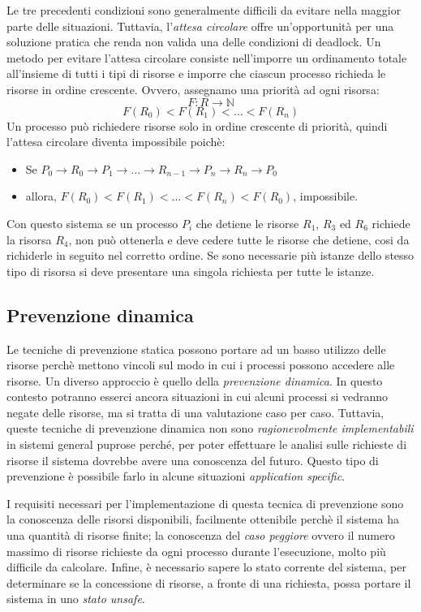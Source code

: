 \documentclass[a4paper,12pt, twoside]{report}
\begin{document}
Le tre precedenti condizioni sono generalmente difficili da evitare nella maggior parte delle situazioni. Tuttavia,
l'\emph{attesa circolare} offre un'opportunit\`a per una soluzione pratica che renda non valida una delle condizioni di
deadlock. Un metodo per evitare l'attesa circolare consiste nell'imporre un ordinamento totale all'insieme di tutti i
tipi di risorse e imporre che ciascun processo richieda le risorse in ordine crescente. Ovvero, assegnamo una priorit\`a
ad ogni risorsa:
\[ F: R \to \mathbb{N} \]
\[ F(R_0) < F(R_1) < \dots < F(R_n) \]
Un processo pu\`o richiedere risorse solo in ordine crescente di priorit\`a, quindi l'attesa circolare diventa impossibile poich\`e:
\begin{itemize}
\item Se $P_0 \to R_0 \to P_1 \to \dots \to R_{n-1} \to P_n \to R_n \to P_0$
\item allora, $F(R_0) < F(R_1) < \dots < F(R_n) < F(R_0)$, impossibile.
\end{itemize}
Con questo sistema se un processo $P_i$ che detiene le risorse $R_1$, $R_3$ ed $R_6$ richiede la risorsa $R_4$, non pu\`o
ottenerla e deve cedere tutte le risorse che detiene, cosi da richiderle in seguito nel corretto ordine. Se sono necessarie
pi\`u istanze dello stesso tipo di risorsa si deve presentare una singola richiesta per tutte le istanze.

\subsection{Prevenzione dinamica}

Le tecniche di prevenzione statica possono portare ad un basso utilizzo delle risorse perch\`e mettono vincoli sul modo
in cui i processi possono accedere alle risorse. Un diverso approccio \`e quello della \emph{prevenzione dinamica}. In
questo contesto potranno esserci ancora situazioni in cui alcuni processi si vedranno negate delle risorse, ma si tratta
di una valutazione caso per caso. Tuttavia, queste tecniche di prevenzione dinamica non sono \emph{ragionevolmente
implementabili} in sistemi general puprose perch\'e, per poter effettuare le analisi sulle richieste di risorse il sistema
dovrebbe avere una conoscenza del futuro. Questo tipo di prevenzione \`e possibile farlo in alcune situazioni \emph{application specific}.

I requisiti necessari per l'implementazione di questa tecnica di prevenzione sono la conoscenza delle risorsi disponibili,
facilmente ottenibile perch\`e il sistema ha una quantit\`a di risorse finite; la conoscenza del \emph{caso peggiore} ovvero
il numero massimo di risorse richieste da ogni processo durante l'esecuzione, molto pi\`u difficile da calcolare. Infine, \`e
necessario sapere lo stato corrente del sistema, per determinare se la concessione di risorse, a fronte di una richiesta,
possa portare il sistema in uno \emph{stato unsafe}.
\end{document}
